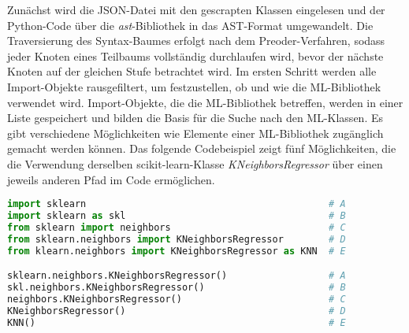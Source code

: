 \documentclass[german,bachelor]{swsLeipzig}
\begin{document}
Zunächst wird die JSON-Datei mit den gescrapten Klassen eingelesen und der Python-Code über die \textit{ast}-Bibliothek in das AST-Format umgewandelt.
Die Traversierung des Syntax-Baumes erfolgt nach dem Preoder-Verfahren, sodass jeder Knoten eines Teilbaums vollständig
durchlaufen wird, bevor der nächste Knoten auf der gleichen Stufe betrachtet wird.
Im ersten Schritt werden alle Import-Objekte rausgefiltert, um festzustellen, ob und wie die ML-Bibliothek verwendet wird.
Import-Objekte, die die ML-Bibliothek betreffen, werden in einer Liste gespeichert und bilden die Basis für die Suche nach
den ML-Klassen.
Es gibt verschiedene Möglichkeiten wie Elemente einer ML-Bibliothek zugänglich gemacht werden können.
Das folgende Codebeispiel zeigt fünf Möglichkeiten, die die Verwendung derselben scikit-learn-Klasse \textit{KNeighborsRegressor}
über einen jeweils anderen Pfad im Code ermöglichen. \\

\begin{lstlisting}[language=Python, frame=single, basicstyle=\small]
import sklearn                                           # A
import sklearn as skl                                    # B
from sklearn import neighbors                            # C
from sklearn.neighbors import KNeighborsRegressor        # D
from klearn.neighbors import KNeighborsRegressor as KNN  # E

sklearn.neighbors.KNeighborsRegressor()                  # A
skl.neighbors.KNeighborsRegressor()                      # B
neighbors.KNeighborsRegressor()                          # C
KNeighborsRegressor()                                    # D
KNN()                                                    # E
\end{lstlisting}
\
\end{document}
